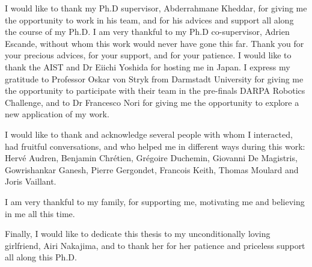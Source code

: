 
\begin{acknowledgements}

I would like to thank my Ph.D supervisor, Abderrahmane Kheddar, for giving me the opportunity to work in his team, and for his advices and support all along the course of my Ph.D.
I am very thankful to my Ph.D co-supervisor, Adrien Escande, without whom this work would never have gone this far.
Thank you for your precious advices, for your support, and for your patience.
I would like to thank the AIST and Dr Eiichi Yoshida for hosting me in Japan.
I express my gratitude to Professor Oskar von Stryk from Darmstadt University for giving me the opportunity to participate with their team in the pre-finals DARPA Robotics Challenge, and to Dr Francesco Nori for giving me the opportunity to explore a new application of my work.

I would like to thank and acknowledge several people with whom I interacted, had fruitful conversations, and who helped me in different ways during this work:
Herv\'e Audren,
Benjamin Chr\'etien,
Gr\'egoire Duchemin,
Giovanni De Magistris,
Gowrishankar Ganesh,
Pierre Gergondet,
Francois Keith,
Thomas Moulard and
Joris Vaillant.

I am very thankful to my family, for supporting me, motivating me and believing in me all this time.

Finally, I would like to dedicate this thesis to my unconditionally loving girlfriend, Airi Nakajima, and to thank her for her patience and priceless support all along this Ph.D.

\end{acknowledgements}
